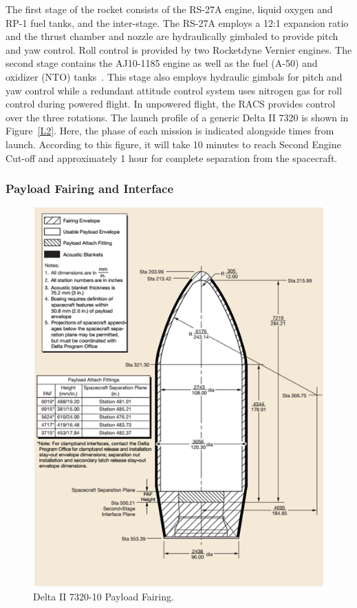 \documentclass[paper=letter, fontsize=11pt]{scrartcl} %
\numberwithin{equation}{section} %
\numberwithin{figure}{section} %
\numberwithin{table}{section} %
\begin{document}
The first stage of the rocket consists of the RS-27A engine, liquid oxygen and RP-1 fuel tanks, and the inter-stage. The RS-27A employs a 12:1 expansion ratio and the thrust chamber and nozzle are hydraulically gimbaled to provide pitch and yaw control. Roll control is provided by two Rocketdyne Vernier engines. The second stage contains the AJ10-1185 engine as well as the fuel (A-50) and oxidizer (NTO) tanks~\cite{ref12_14}. This stage also employs hydraulic gimbals for pitch and yaw control while a redundant attitude control system uses nitrogen gas for roll control during powered flight. In unpowered flight, the RACS provides control over the three rotations. The launch profile of a generic Delta II 7320 is shown in Figure~\ref{L2}. Here, the phase of each mission is indicated alongside times from launch. According to this figure, it will take 10 minutes to reach Second Engine Cut-off and approximately 1 hour for complete separation from the spacecraft.

\subsubsection{Payload Fairing and Interface}
\begin{figure}[H]
    \centering
    \includegraphics[width=.75\textwidth]{12-3.png}
    \caption{Delta II 7320-10 Payload Fairing.}
    \label{L3}
\end{figure}
\end{document}
